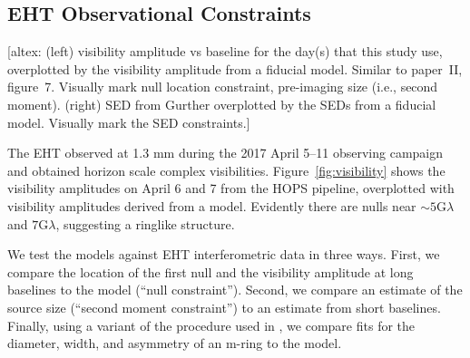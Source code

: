 \subsection{EHT Observational Constraints}


\begin{figure*}
  \centering
  [altex: (left) visibility amplitude vs baseline for the day(s) that
    this study use, overplotted by the visibility amplitude from a
    fiducial model.
    Similar to paper~II, figure~7.
    Visually mark null location constraint, pre-imaging size (i.e.,
    second moment).
    (right) SED from Gurther overplotted by the SEDs from a fiducial
    model.
    Visually mark the SED constraints.]
  \caption{(\emph{left}) Measured correlated flux densities of \sgra
    on April 7, 2017, from the HOPS pipeline, overplotted with a fiducial
    GRMHD+GRRT model.
    Details on the data can be found in paper~II, section~5.
    A description of the fiducial model is in section~\ref{sec:models}.
    (\emph{right}) }
  \label{fig:visibility}
\end{figure*}

The EHT observed \sgra at 1.3 mm during the 2017 April 5--11 observing campaign and obtained horizon scale complex visibilities.  Figure~\ref{fig:visibility} shows the visibility amplitudes on April 6 and 7 from  the HOPS pipeline, overplotted with visibility amplitudes derived from a model.  Evidently there are nulls near $\sim 5\mathrm{G}\lambda$ and $7\mathrm{G}\lambda$, suggesting a ringlike structure.

We test the models against EHT interferometric data in three ways.  First, we compare the location of the first null and the visibility amplitude at long baselines to the model (``null constraint'').  Second, we compare an estimate of the source size (``second moment constraint'') to an estimate from short baselines.  Finally, using a variant of the procedure used in , we compare fits for the diameter, width, and asymmetry of an m-ring to the model.  

